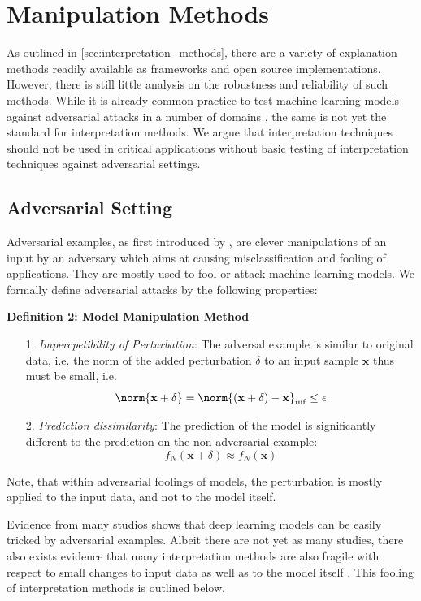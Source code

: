 \section{Manipulation Methods}
\label{sec:manipulation_methods}

As outlined in \autoref{sec:interpretation_methods}, there are a variety of explanation methods readily available as frameworks and open source implementations. However, there is still little analysis on the robustness and reliability of such methods. 
While it is already common practice to test machine learning models against adversarial attacks in a number of domains \cite{gao2019universal, kereliuk2015deep}, the same is not yet the standard for interpretation methods. We argue that interpretation techniques should not be used in critical applications without basic testing of interpretation techniques against adversarial settings.

\subsection{Adversarial Setting}
\label{subsec:adversarial_setting}
Adversarial examples, as first introduced by \cite{szegedy_intriguing}, are clever manipulations of an input by an adversary which aims at causing misclassification and fooling of applications. They are mostly used to fool or attack machine learning models. We formally define adversarial attacks by the following properties: 
\par\smallskip
\textbf{Definition 2: Model Manipulation Method}
\begin{enumerate}
    \item[1.] \textit{Impercpetibility of Perturbation}: The adversal example is similar to original data, i.e. the norm of the added perturbation $\delta$ to an input sample $\mathbf{x}$ thus must be small, i.e. $$\norm{\mathbf{x}+\delta} = \norm{(\mathbf{x}+\delta)-\mathbf{x}}_{\inf} \leq \epsilon$$
    \item[2.] \textit{Prediction dissimilarity}: The prediction of the model is significantly different to the prediction on the non-adversarial example: $$f_N(\mathbf{x}+\delta) \approx f_N(\mathbf{x})$$
\end{enumerate}
Note, that within adversarial foolings of models, the perturbation is mostly applied to the input data, and not to the model itself.

Evidence from many studios shows that deep learning models can be easily tricked by adversarial examples. 
Albeit there are not yet as many studies, there also exists evidence that many interpretation methods are also fragile with respect to small changes to input data \cite{adebayo2018sanity, samek2019explainable, alvarez2018towards} as well as to the model itself \cite{fooling_nn_interpreters, dimanov2020you}. This fooling of interpretation methods is outlined below. 

